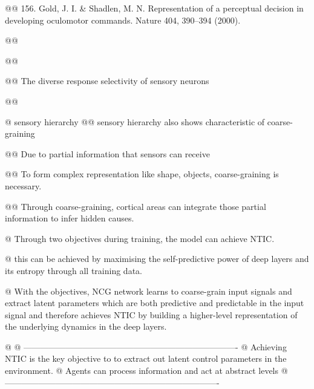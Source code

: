 \documentclass[utf8]{article}
\begin{document}
\begin{WritingMaterials}
				@@  156. Gold, J. I. \& Shadlen, M. N. Representation of a perceptual decision in developing oculomotor commands. Nature 404, 390–394 (2000).


				@@ 



				@@ 

				@@ The diverse response selectivity of sensory neurons

				@@ 



				@ sensory hierarchy
					@@ sensory hierarchy also shows characteristic of coarse-graining


					@@ Due to partial information that sensors can receive

					@@ To form complex representation like shape, objects, coarse-graining is necessary.


					@@ Through coarse-graining,  cortical areas can integrate those partial information to infer hidden causes.

				

				@ Through two objectives during training, the model can achieve NTIC.

				@ this can be achieved by maximising the self-predictive power of deep layers and its entropy through all training data.

				@ With the objectives, NCG network learns to coarse-grain input signals and  extract latent parameters which are both predictive and predictable in the input signal and therefore achieves NTIC by building a higher-level representation of the underlying dynamics in the deep layers.

                @ 
                @ ----------------------------------------------------------------------------
                @ Achieving NTIC is the key objective to to extract out latent control parameters in the environment.
				@ Agents can process information and act at abstract levels
				@ ----------------------------------------------------------------------------
			    


\end{WritingMaterials}
\end{document}
